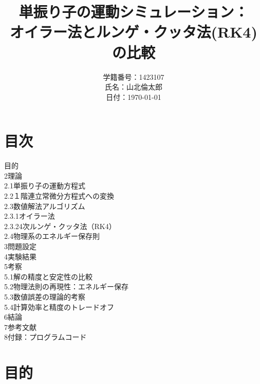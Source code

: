 \documentclass{article}
\title{単振り子の運動シミュレーション：\\オイラー法とルンゲ・クッタ法(RK4)の比較}
\author{学籍番号：1423107 \\ 氏名：山北倫太郎 \\ 日付：\today}
\date{}
\begin{document}
\maketitle %

\section*{目次}
\vspace{1em} %

\quad 目的 \\
2\quad 理論 \\
\hspace{1em} 2.1\quad 単振り子の運動方程式 \\
\hspace{1em} 2.2\quad １階連立常微分方程式への変換 \\
\hspace{1em} 2.3\quad 数値解法アルゴリズム \\
\hspace{2em} 2.3.1\quad オイラー法 \\
\hspace{2em} 2.3.2\quad 4次ルンゲ・クッタ法（RK4） \\
\hspace{1em} 2.4\quad 物理系のエネルギー保存則 \\
3\quad 問題設定 \\
4\quad 実験結果 \\
5\quad 考察 \\
\hspace{1em} 5.1\quad 解の精度と安定性の比較 \\
\hspace{1em} 5.2\quad 物理法則の再現性：エネルギー保存 \\
\hspace{1em} 5.3\quad 数値誤差の理論的考察 \\
\hspace{1em} 5.4\quad 計算効率と精度のトレードオフ \\
6\quad 結論 \\
7\quad 参考文献 \\
8\quad 付録：プログラムコード \\

\section{目的}
\end{document}
